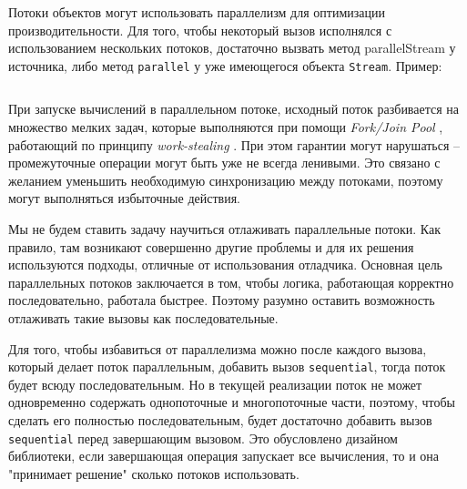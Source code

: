 Потоки объектов могут использовать параллелизм для оптимизации производительности. Для того, чтобы некоторый вызов исполнялся с использованием нескольких потоков, достаточно вызвать метод parallelStream у источника, либо метод \texttt{parallel} у уже имеющегося объекта \texttt{Stream}. Пример: 
\inputminted{java}{chapter2/code/ParallelStream.java}
При запуске вычислений в параллельном потоке, исходный поток разбивается на множество мелких задач, которые выполняются при помощи\textit{ Fork/Join Pool} \cite{java:forkjoin}, работающий по принципу \textit{work-stealing} \cite{wiki:worksteal}. При этом гарантии могут нарушаться -- промежуточные операции могут быть уже не всегда ленивыми. Это связано с желанием уменьшить необходимую синхронизацию между потоками, поэтому могут выполняться избыточные действия.

Мы не будем ставить задачу научиться отлаживать параллельные потоки. Как правило, там возникают совершенно другие проблемы и для их решения используются подходы, отличные от использования отладчика. Основная цель параллельных потоков заключается в том, чтобы логика, работающая корректно последовательно, работала быстрее. Поэтому разумно оставить возможность отлаживать такие вызовы как последовательные.

Для того, чтобы избавиться от параллелизма можно после каждого вызова, который делает поток параллельным, добавить вызов \texttt{sequential}, тогда поток будет всюду последовательным. Но в текущей реализации поток не может одновременно содержать однопоточные и многопоточные части, поэтому, чтобы сделать его полностью последовательным, будет достаточно добавить вызов \texttt{sequential} перед завершающим вызовом. Это обусловлено дизайном библиотеки, если завершающая операция запускает все вычисления, то и она "принимает решение" сколько потоков использовать.

